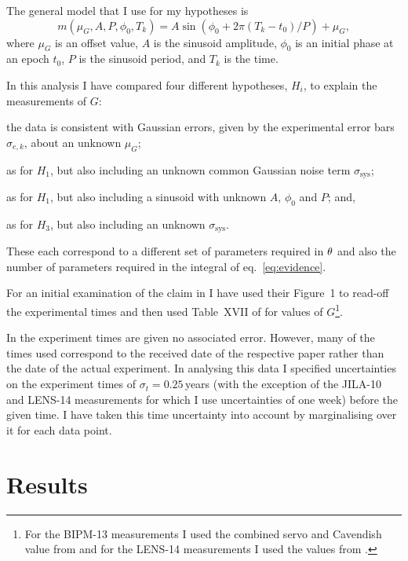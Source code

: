 \documentclass[doublecol]{epl2}
\begin{document}
The general model that I use for my hypotheses is
\begin{equation}\label{eq:model}
 m(\mu_G, A, P, \phi_0, T_k) = A\sin{(\phi_0 + 2\pi (T_k-t_0)/P)} + \mu_G,
\end{equation}
where $\mu_G$ is an offset value, $A$ is the sinusoid amplitude, $\phi_0$ is an initial phase at an epoch $t_0$,
$P$ is the sinusoid period, and $T_k$ is the time.

In this analysis I have compared four different hypotheses, $H_i$, to explain the measurements of $G$:
\begin{enumerate*}[label=$H_{\arabic*}$\upshape)]
 \item the data is consistent with Gaussian errors, given by the experimental error bars $\sigma_{e,k}$, about an 
 unknown $\mu_G$;
 \item as for $H_1$, but also including an unknown common Gaussian noise term $\sigma_{\mathrm{sys}}$;
 \item as for $H_1$, but also including a sinusoid with unknown $A$, $\phi_0$ and $P$; and, 
 \item as for $H_3$, but also including an unknown $\sigma_{\mathrm{sys}}$.
\end{enumerate*}
These each correspond to a different set of parameters required in $\mathbf{\theta}$ and also the number of
parameters required in the integral of eq.~\ref{eq:evidence}.

For an initial examination of the claim in \cite{2015EL....11010002A} I have used their Figure~1 to read-off
the experimental times and then used Table~XVII of \cite{RevModPhys.84.1527} for values of $G$\footnote{For
the BIPM-13 measurements I used the combined servo and Cavendish value from \cite{PhysRevLett.113.039901}
and for the LENS-14 measurements I used the values from \cite{2014Natur.510..518R}.}.

In \cite{2015EL....11010002A} the experiment times are given no associated error.
However, many of the times used correspond to the received date of the respective paper rather than the
date of the actual experiment.  In analysing this data I specified uncertainties on the experiment times of
$\sigma_{t} = 0.25$\,years (with the exception of the JILA-10 and LENS-14 measurements for which I use uncertainties
of one week) before the given time. I have taken this time uncertainty into account by marginalising over
it for each data point.

\section{Results}
\end{document}
